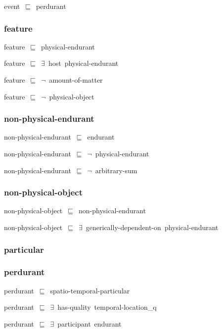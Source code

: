 \documentclass{article}
\begin{document}
event~\ensuremath{\sqsubseteq}~perdurant~

\subsubsection*{feature}

feature~\ensuremath{\sqsubseteq}~physical-endurant~

feature~\ensuremath{\sqsubseteq}~\ensuremath{\exists}~host~physical-endurant~

feature~\ensuremath{\sqsubseteq}~\ensuremath{\lnot}~amount-of-matter

feature~\ensuremath{\sqsubseteq}~\ensuremath{\lnot}~physical-object

\subsubsection*{non-physical-endurant}

non-physical-endurant~\ensuremath{\sqsubseteq}~endurant~

non-physical-endurant~\ensuremath{\sqsubseteq}~\ensuremath{\lnot}~physical-endurant

non-physical-endurant~\ensuremath{\sqsubseteq}~\ensuremath{\lnot}~arbitrary-sum

\subsubsection*{non-physical-object}

non-physical-object~\ensuremath{\sqsubseteq}~non-physical-endurant~

non-physical-object~\ensuremath{\sqsubseteq}~\ensuremath{\exists}~generically-dependent-on~physical-endurant~

\subsubsection*{particular}

\subsubsection*{perdurant}

perdurant~\ensuremath{\sqsubseteq}~spatio-temporal-particular~

perdurant~\ensuremath{\sqsubseteq}~\ensuremath{\exists}~has-quality~temporal-location\_q~

perdurant~\ensuremath{\sqsubseteq}~\ensuremath{\exists}~participant~endurant~
\end{document}
